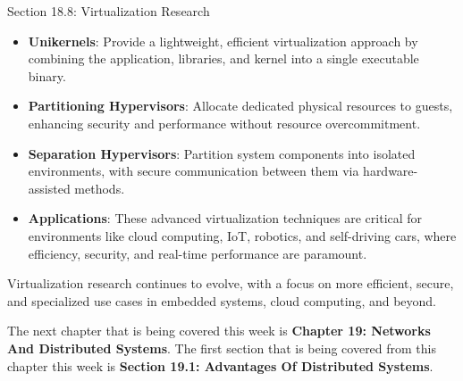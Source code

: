 \begin{notes}{Section 18.8: Virtualization Research}
\begin{highlight}
    \end{highlight}
    
    \begin{highlight}
    
        \begin{itemize}
            \item \textbf{Unikernels}: Provide a lightweight, efficient virtualization approach by combining the application, libraries, and kernel into a single executable binary.
            \item \textbf{Partitioning Hypervisors}: Allocate dedicated physical resources to guests, enhancing security and performance without resource overcommitment.
            \item \textbf{Separation Hypervisors}: Partition system components into isolated environments, with secure communication between them via hardware-assisted methods.
            \item \textbf{Applications}: These advanced virtualization techniques are critical for environments like cloud computing, IoT, robotics, and self-driving cars, where efficiency, security, 
            and real-time performance are paramount.
        \end{itemize}
    
    Virtualization research continues to evolve, with a focus on more efficient, secure, and specialized use cases in embedded systems, cloud computing, and beyond.
    
    \end{highlight}
\end{notes}

The next chapter that is being covered this week is \textbf{Chapter 19: Networks And Distributed Systems}. The first section that is being covered from this chapter this week is 
\textbf{Section 19.1: Advantages Of Distributed Systems}.

